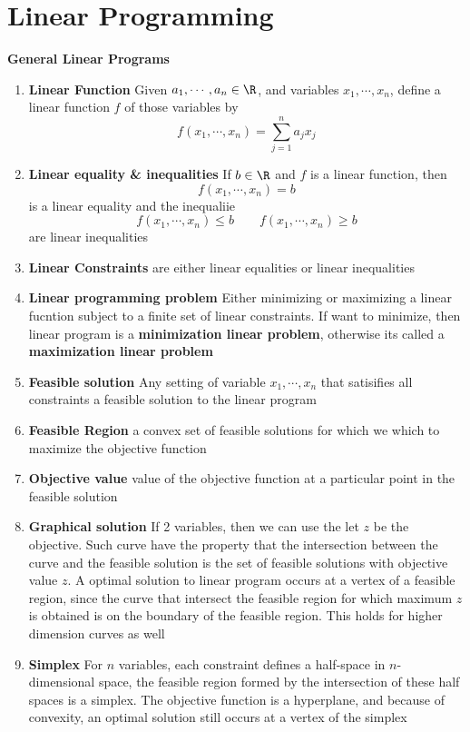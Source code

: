 \documentclass[11pt]{article}
\begin{document}
\section*{Linear Programming}


\begin{defn*}
    \textbf{General Linear Programs} 
    \begin{enumerate}
        \item \textbf{Linear Function} Given $a_1,\cdots, a_n\in \R$, and variables $x_1,\cdots,x_n$, define a linear function $f$ of those variables by 
        \[
            f(x_1,\cdots, x_n) = \sum_{j=1}^n a_j x_j
        \]
        \item \textbf{Linear equality \& inequalities} If $b\in \R$ and $f$ is a linear function, then 
        \[
            f(x_1, \cdots, x_n)  =b
        \]
        is a linear equality and the inequaliie 
        \[
            f(x_1,\cdots, x_n) \leq b \quad \quad f(x_1,\cdots, x_n) \geq b 
        \]
        are linear inequalities
        \item \textbf{Linear Constraints} are either linear equalities or linear inequalities 
        \item \textbf{Linear programming problem} Either minimizing or maximizing a linear fucntion subject to a finite set of linear constraints. If want to minimize, then linear program is a \textbf{minimization linear problem}, otherwise its called a \textbf{maximization linear problem}
        \item \textbf{Feasible solution} Any setting of variable $x_1,\cdots, x_n$ that satisifies all constraints a feasible solution to the linear program 
        \item \textbf{Feasible Region} a convex set of feasible solutions for which we which to maximize the objective function
        \item \textbf{Objective value} value of the objective function at a particular point in the feasible solution
        \item \textbf{Graphical solution} If 2 variables, then we can use the let $z$ be the objective. Such curve have the property that the intersection between the curve and the feasible solution is the set of feasible solutions with objective value $z$. A optimal solution to linear program occurs at a vertex of a feasible region, since the curve that intersect the feasible region for which maximum $z$ is obtained is on the boundary of the feasible region. This holds for higher dimension curves as well
        \item \textbf{Simplex} For $n$ variables, each constraint defines a half-space in $n$-dimensional space, the feasible region formed by the intersection of these half spaces is a simplex. The objective function is a hyperplane, and because of convexity, an optimal solution still occurs at a vertex of the simplex

\end{enumerate}
\end{defn*}
\end{document}
